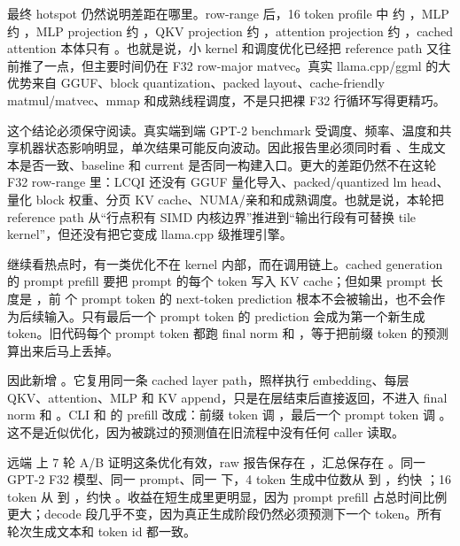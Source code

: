 最终 hotspot 仍然说明差距在哪里。row-range 后，16 token profile 中  约 ，MLP  约 ，MLP projection 约 ，QKV projection 约 ，attention projection 约 ，cached attention 本体只有 。也就是说，小 kernel 和调度优化已经把 reference path 又往前推了一点，但主要时间仍在 F32 row-major matvec。真实 llama.cpp/ggml 的大优势来自 GGUF、block quantization、packed layout、cache-friendly matmul/matvec、mmap 和成熟线程调度，不是只把裸 F32 行循环写得更精巧。

这个结论必须保守阅读。真实端到端 GPT-2 benchmark 受调度、频率、温度和共享机器状态影响明显，单次结果可能反向波动。因此报告里必须同时看 、生成文本是否一致、baseline 和 current 是否同一构建入口。更大的差距仍然不在这轮 F32 row-range 里：LCQI 还没有 GGUF 量化导入、packed/quantized lm head、量化 block 权重、分页 KV cache、NUMA/亲和和成熟调度。也就是说，本轮把 reference path 从“行点积有 SIMD 内核边界”推进到“输出行段有可替换 tile kernel”，但还没有把它变成 llama.cpp 级推理引擎。

继续看热点时，有一类优化不在 kernel 内部，而在调用链上。cached generation 的 prompt prefill 要把 prompt 的每个 token 写入 KV cache；但如果 prompt 长度是 ，前  个 prompt token 的 next-token prediction 根本不会被输出，也不会作为后续输入。只有最后一个 prompt token 的 prediction 会成为第一个新生成 token。旧代码每个 prompt token 都跑 final norm 和 ，等于把前缀 token 的预测算出来后马上丢掉。

因此新增 。它复用同一条 cached layer path，照样执行 embedding、每层 QKV、attention、MLP 和 KV append，只是在层结束后直接返回，不进入 final norm 和 。CLI 和  的 prefill 改成：前缀 token 调 ，最后一个 prompt token 调 。这不是近似优化，因为被跳过的预测值在旧流程中没有任何 caller 读取。

远端  上 7 轮 A/B 证明这条优化有效，raw 报告保存在 ，汇总保存在 。同一 GPT-2 F32 模型、同一 prompt、同一  下，4 token 生成中位数从  到 ，约快 ；16 token 从  到 ，约快 。收益在短生成里更明显，因为 prompt prefill 占总时间比例更大；decode 段几乎不变，因为真正生成阶段仍然必须预测下一个 token。所有轮次生成文本和 token id 都一致。

